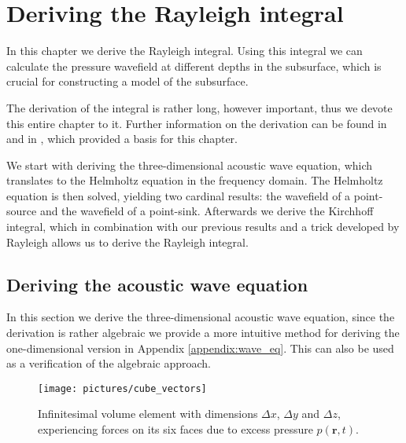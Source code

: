 \chapter{Deriving the Rayleigh integral}
\label{chap2}
In this chapter we derive the Rayleigh integral. Using this integral we can calculate the pressure wavefield at different depths in the subsurface, which is crucial for constructing a model of the subsurface.

The derivation of the integral is rather long, however important, thus we devote this entire chapter to it.
Further information on the derivation can be found in \citeauthor{Book_Eric} \cite[Chapter 3-4]{Book_Eric} and in \citeauthor{Kutscha} \cite[Appendix A]{Kutscha}, which provided a basis for this chapter.

We start with deriving the three-dimensional acoustic wave equation, which translates to the Helmholtz equation in the frequency domain.
The Helmholtz equation is then solved, yielding two cardinal results: the wavefield of a point-source and the wavefield of a point-sink.
Afterwards we derive the Kirchhoff integral, which in combination with our previous results and a trick developed by Rayleigh allows us to derive the Rayleigh integral.

\section{Deriving the acoustic wave equation}
\label{sec:wave_eq}
In this section we derive the three-dimensional acoustic wave equation, since the derivation is rather algebraic we provide a more intuitive method for deriving the one-dimensional version in Appendix \ref{appendix:wave_eq}.
This can also be used as a verification of the algebraic approach.

\begin{wrapfigure}{r}{.5\textwidth}
    \vspace{-1.5em}
    \centering
    \texttt{[image: pictures/cube\_vectors]}
    \vspace{-2em}
    \caption{Infinitesimal volume element with dimensions $\Delta x$, $\Delta y$ and $\Delta z$, experiencing forces on its six faces due to excess pressure $p(\mathbf r, t)$.}
    \label{fig:cube}
    \vspace{-1em}
\end{wrapfigure}

